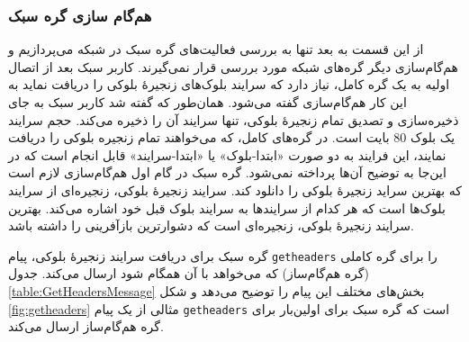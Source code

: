 \subsubsection{هم‌گام سازی گره سبک}
از این قسمت به بعد تنها به بررسی فعالیت‌های گره سبک در شبکه می‌پردازیم و هم‌گام‌سازی دیگر گره‌های شبکه مورد بررسی قرار نمی‌گیرند. کاربر سبک بعد از اتصال اولیه به یک گره کامل، نیاز دارد که سرایند بلوک‌های زنجیرهٔ بلوکی را دریافت نماید به این کار 
هم‌گام‌سازی 
 گفته می‌شود. همان‌طور که گفته شد کاربر سبک به جای ذخیره‌سازی و تصدیق تمام زنجیرهٔ بلوکی،‌ تنها سرایند آن را ذخیره می‌کند. حجم سرایند یک بلوک $80$ بایت است. در گره‌های کامل، که می‌خواهند تمام زنجیره بلوکی را دریافت نمایند، این فرایند به دو صورت
«ابتدا-بلوک»
یا
«ابتدا-سرایند»
قابل انجام است که در این‌جا به توضیح آن‌ها پرداخته نمی‌شود. گره سبک در گام اول هم‌گام‌سازی لازم است که بهترین سراید زنجیرهٔ بلوکی  را دانلود کند. سرایند زنجیرهٔ بلوکی، زنجیره‌ای از سرایند بلوک‌ها است که هر کدام از سرایند‌ها به سرایند بلوک قبل خود اشاره می‌کند. بهترین سرایند زنجیرهٔ بلوکی، زنجیره‌ای است که دشوارترین بازآفرینی را داشته باشد. 

گره سبک برای دریافت سرایند زنجیرهٔ بلوکی، پیام \texttt{getheaders} را برای گره کاملی (گره هم‌گام‌ساز) که می‌خواهد با آن همگام شود ارسال می‌کند. جدول \ref{table:GetHeadersMessage} بخش‌های مختلف این پیام را توضیح می‌دهد و شکل \ref{fig:getheaders} مثالی از یک پیام \texttt{getheaders} است که گره سبک برای اولین‌بار برای گره هم‌گام‌ساز ارسال می‌کند.




